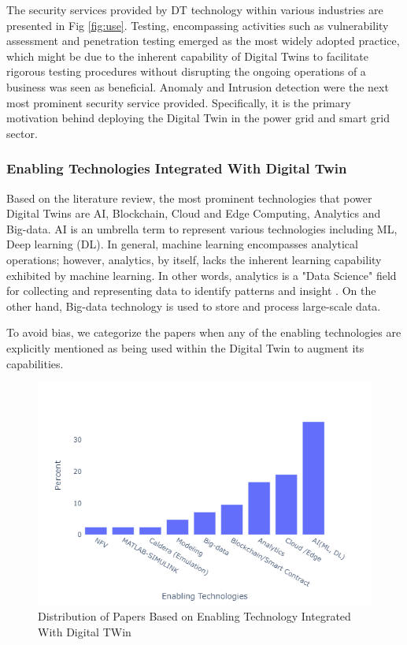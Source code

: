The security services provided by DT technology within various industries are presented in Fig \ref{fig:use}. Testing, encompassing activities such as vulnerability assessment
and penetration testing emerged as the most widely adopted practice, which might be due to the inherent capability of Digital Twins to facilitate rigorous testing procedures without disrupting the ongoing operations of a business was seen as beneficial. Anomaly and Intrusion detection were the next most prominent security service provided. Specifically, it is the primary motivation behind deploying the Digital Twin in the power grid and smart grid sector.


\subsubsection*{Enabling Technologies Integrated With Digital Twin }

Based on the literature review, the most prominent technologies that power Digital Twins are AI, Blockchain, Cloud and Edge Computing, Analytics and Big-data. AI is an umbrella term to represent various technologies including ML, Deep learning (DL). In general, machine learning encompasses analytical operations; however, analytics, by itself, lacks the inherent learning capability exhibited by machine learning. In other words, analytics is a "Data Science" field for collecting and representing data to identify patterns and insight \cite{fuller_digital_2020}. On the other hand, Big-data technology is used to store and process large-scale data. 

To avoid bias, we categorize the papers when any of the enabling technologies are explicitly mentioned as being used within the Digital Twin to augment its capabilities.  

\begin{figure}[H]  
    {
        \centering
        \includegraphics[width=1\textwidth]{images/rt/dt-enablingtech.png}
        \caption{Distribution of Papers Based on Enabling Technology Integrated With Digital TWin}
        \label{fig:enable}
    }
\end{figure}


